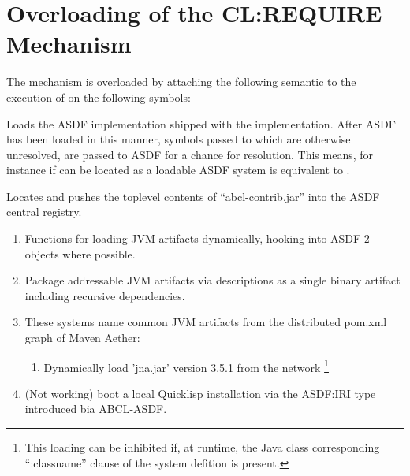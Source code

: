\documentclass[10pt]{book}
\begin{document}
\section{Overloading of the CL:REQUIRE Mechanism}

The  mechanism is overloaded by attaching the following
semantic to the execution of  on the following symbols:

\begin{description}

  \item{} Loads the \textsc{ASDF} implementation shipped
    with the implementation.  After \textsc{ASDF} has been loaded in
    this manner, symbols passed to  which are
    otherwise unresolved, are passed to ASDF for a chance for
    resolution.  This means, for instance if  can be
    located as a loadable \textsc{ASDF} system  is equivalent to .

  \item{} Locates and pushes the toplevel contents of
    ``abcl-contrib.jar'' into the \textsc{ASDF} central registry.  

    \begin{enumerate}
      \item {}
        Functions for loading JVM artifacts dynamically, hooking into ASDF 2 objects where possible.
      \item {} Package addressable JVM artifacts via
         descriptions as a single binary artifact
        including recursive dependencies.
      \item {}
        These systems name common JVM artifacts from the distributed pom.xml graph of Maven Aether:
        \begin{enumerate}
          \item {} Dynamically load 'jna.jar' version 3.5.1
            from the network \footnote{This loading can be inhibited
              if, at runtime, the Java class corresponding
              ``:classname'' clause of the system defition is present.}
        \end{enumerate}
      \item {} (Not working) boot a local Quicklisp
        installation via the ASDF:IRI type introduced bia ABCL-ASDF.
        
    \end{enumerate}

\end{description}
\end{document}
